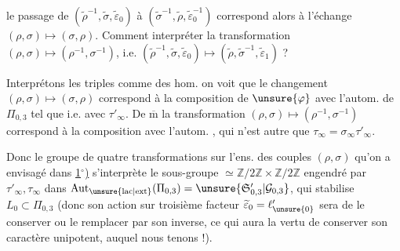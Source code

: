 


le passage de $(\widetilde\rho^{-1},\widetilde\sigma,\widetilde\varepsilon_0)$ à $(\widetilde\sigma^{-1},\widetilde\rho,\widetilde\varepsilon_0^{-1})$ correspond alors à l'échange $(\rho,\sigma)\mapsto(\sigma,\rho)$. Comment  interpréter la transformation $(\rho,\sigma)\mapsto(\rho^{-1},\sigma^{-1})$, i.e. $(\widetilde\rho^{-1},\widetilde\sigma,\widetilde\varepsilon_0)\mapsto(\widetilde\rho,\widetilde\sigma^{-1},\widetilde\varepsilon_1)$ ?

Interprétons les triples comme des hom.
on voit que le changement $(\rho,\sigma)\mapsto(\sigma,\rho)$ correspond à la composition de $\unsure{\varphi}$ avec l'autom. de $\Pi_{0,3}$ tel que
i.e. avec \uline{$\tau'_\infty$}. De $\overline{\mathrm m}$ la transformation $(\rho,\sigma)\mapsto(\rho^{-1},\sigma^{-1})$ correspond à la composition avec l'autom.
,
qui n'est autre que \uline{$\tau_\infty$}$=\sigma_\infty\tau'_\infty$.

Donc le groupe de quatre transformations  sur l'ens. des couples $(\rho,\sigma)$ qu'on a envisagé dans \uline{1$^\circ$)} s'interprète   le sous-groupe $\simeq\mathbb Z/2\mathbb Z\times\mathbb Z/2\mathbb Z$ engendré par $\tau'_\infty,\tau_\infty$ dans $\operatorname{Aut}_{\unsure{\mathrm{lac}|\mathrm{ext}}}(\Pi_{0,3})=\unsure{\mathfrak S'_{0,3}|\mathcal G_{0,3}}$, qui  stabilise $L_0\subset\Pi_{0,3}$ (donc son action sur  troisième facteur $\widetilde\varepsilon_0=\ell'_{\unsure{0}}$ sera de le conserver ou le remplacer par son inverse,  ce qui aura la vertu de  conserver son caractère unipotent, auquel nous tenons !).

